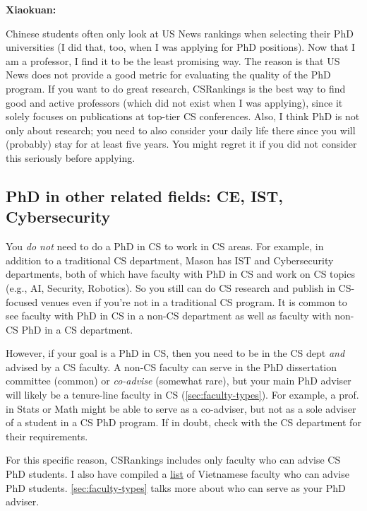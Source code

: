 \documentclass[oneside,11pt,dvipsnames]{book}
\newenvironment{commentbox}[1][]{
  \small
  \begin{mybox}
    {\small \textbf{#1}}
  }{
  \end{mybox}
}
\begin{document}
\begin{commentbox}[Xiaokuan:]
  Chinese students often only look at US News rankings when selecting their PhD universities (I did that, too, when I was applying for PhD positions).
  Now that I am a professor, I find it to be the least promising way.
  The reason is that US News does not provide a good metric for evaluating the quality of the PhD program.
  If you want to do great research, CSRankings is the best way to find good and active professors (which did not exist when I was applying),
  since it solely focuses on publications at top-tier CS conferences.
  Also,
  I think PhD is not only about research;
  you need to also consider your daily life there since you will (probably) stay for at least five years.
  You might regret it if you did not consider this seriously before applying.
\end{commentbox}


\subsection{PhD in other related fields: CE, IST, Cybersecurity}\label{sec:related-fields}

You \emph{do not} need to do a PhD in CS to work in CS areas. For example, in addition to a traditional CS department, Mason has IST and Cybersecurity departments, both of which have faculty with PhD in CS and work on CS topics (e.g., AI, Security, Robotics).  So you still can do CS research and publish in CS-focused venues even if you're not in a traditional CS program.  It is common to see faculty with PhD in CS in a non-CS department as well as faculty with non-CS PhD in a CS department.

However, if your goal is a PhD in CS, then you need to be in the CS dept \emph{and} advised by a CS faculty. A non-CS faculty can serve in the PhD dissertation committee (common) or \emph{co-advise} (somewhat rare), but your main PhD adviser will likely be a tenure-line faculty in CS (\autoref{sec:faculty-types}).
For example, a prof. in Stats or Math might be able to serve as a co-adviser, but not as a sole adviser of a student in a CS PhD program. 
If in doubt, check with the CS department for their requirements.

For this specific reason,  CSRankings includes only faculty who can advise CS PhD students. I also have compiled a \href{https://github.com/dynaroars/dynaroars.github.io/wiki/Viet-CS-Profs-US}{list} of Vietnamese faculty who can advise PhD students. \autoref{sec:faculty-types} talks more about who can serve as your PhD adviser.
\end{document}

